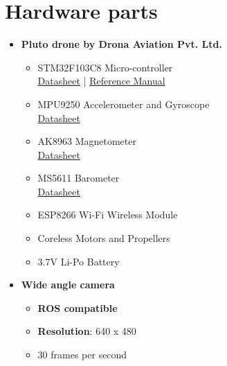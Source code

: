 \documentclass[a4paper,12pt,oneside]{book}
\begin{document}
\section{Hardware parts}
\begin{itemize}
    \item \textbf{Pluto drone by Drona Aviation Pvt. Ltd.}\\
   \begin{itemize}
\item STM32F103C8 Micro-controller\\
\href{https://github.com/eYSIP-2018/Autotuning-of-Controller-For-Drone/blob/master/datasheets/stm32-datasheet.pdf}{Datasheet} | \href{https://github.com/eYSIP-2018/Autotuning-of-Controller-For-Drone/blob/master/datasheets/stm32-ref-manual.pdf}{Reference Manual}

\item MPU9250 Accelerometer and Gyroscope \\
\href{https://github.com/eYSIP-2018/Autotuning-of-Controller-For-Drone/blob/master/datasheets/MPU-9250-Datasheet.pdf}{Datasheet} 

\item AK8963 Magnetometer \\
\href{https://github.com/eYSIP-2018/Autotuning-of-Controller-For-Drone/blob/master/datasheets/AK8963.pdf}{Datasheet} 

\item MS5611 Barometer\\
\href{https://github.com/eYSIP-2018/Autotuning-of-Controller-For-Drone/blob/master/datasheets/stm32-ref-manual.pdf}{Datasheet}

\item ESP8266 Wi-Fi Wireless Module
\item Coreless Motors and Propellers 

\item 3.7V Li-Po Battery \\

\end{itemize}
     \item \textbf{Wide angle camera}
     \begin{itemize}
        \item\textbf{ROS compatible}
         \item \textbf{Resolution}: 640 x 480
         \item 30 frames per second
     \end{itemize}
     

\end{itemize}
\end{document}
